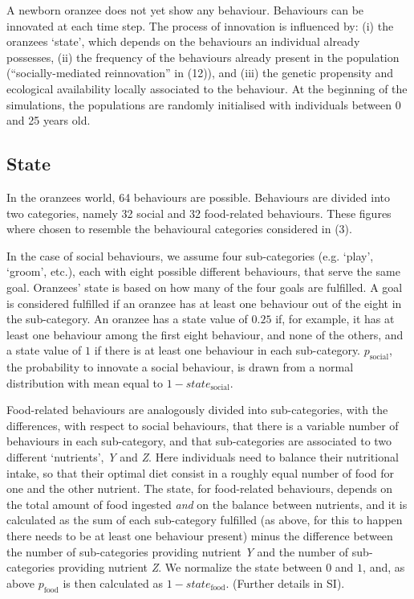 \documentclass[9pt,twocolumn,twoside,]{pnas-new}
\begin{document}
A newborn oranzee does not yet show any behaviour. Behaviours can be
innovated at each time step. The process of innovation is influenced by:
(i) the oranzees `state', which depends on the behaviours an individual
already possesses, (ii) the frequency of the behaviours already present
in the population (``socially-mediated reinnovation'' in (12)), and
(iii) the genetic propensity and ecological availability locally
associated to the behaviour. At the beginning of the simulations, the
populations are randomly initialised with individuals between 0 and 25
years old.

\subsection*{State}\label{format}

In the oranzees world, 64 behaviours are possible. Behaviours are
divided into two categories, namely 32 social and 32 food-related
behaviours. These figures where chosen to resemble the behavioural
categories considered in (3).

In the case of social behaviours, we assume four sub-categories (e.g.
`play', `groom', etc.), each with eight possible different behaviours,
that serve the same goal. Oranzees' state is based on how many of the
four goals are fulfilled. A goal is considered fulfilled if an oranzee
has at least one behaviour out of the eight in the sub-category. An
oranzee has a state value of \(0.25\) if, for example, it has at least
one behaviour among the first eight behaviour, and none of the others,
and a state value of \(1\) if there is at least one behaviour in each
sub-category. \(p_\text{social}\), the probability to innovate a social
behaviour, is drawn from a normal distribution with mean equal to
\(1-state_\text{social}\).

Food-related behaviours are analogously divided into sub-categories,
with the differences, with respect to social behaviours, that there is a
variable number of behaviours in each sub-category, and that
sub-categories are associated to two different `nutrients', \emph{Y} and
\emph{Z}. Here individuals need to balance their nutritional intake, so
that their optimal diet consist in a roughly equal number of food for
one and the other nutrient. The state, for food-related behaviours,
depends on the total amount of food ingested \emph{and} on the balance
between nutrients, and it is calculated as the sum of each sub-category
fulfilled (as above, for this to happen there needs to be at least one
behaviour present) minus the difference between the number of
sub-categories providing nutrient \emph{Y} and the number of
sub-categories providing nutrient \emph{Z}. We normalize the state
between \(0\) and \(1\), and, as above \(p_\text{food}\) is then
calculated as \(1-state_\text{food}\). (Further details in SI).
\end{document}
